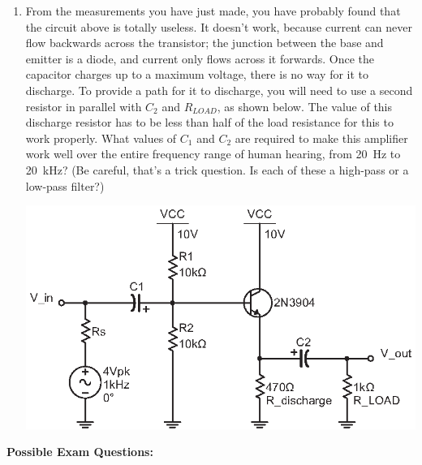 \begin{enumerate}[wide]
\item From the measurements you have just made, you have probably found that the circuit above is totally useless.  It doesn't work, because current can never flow backwards across the transistor; the junction between the base and emitter is a diode, and current only flows across it forwards. Once the capacitor charges up to a maximum voltage, there is no way for it to discharge.  To provide a path for it to discharge, you will need to use a second resistor in parallel with $C_2$ and $R_{LOAD}$, as shown below.  The value of this discharge resistor has to be less than half of the load resistance for this to work properly.  What values of $C_1$ and $C_2$ are required to make this amplifier work well over the entire frequency range of human hearing, from 20~Hz to 20~kHz?  (Be careful, that's a trick question.  Is each of these a high-pass or a low-pass filter?) \label{part_biased_output_and_input_correct}
\begin{center}
\includegraphics{bjt/biased_output_and_input_correct.eps}
\end{center}

\end{enumerate}

\textbf{Possible Exam Questions:}

